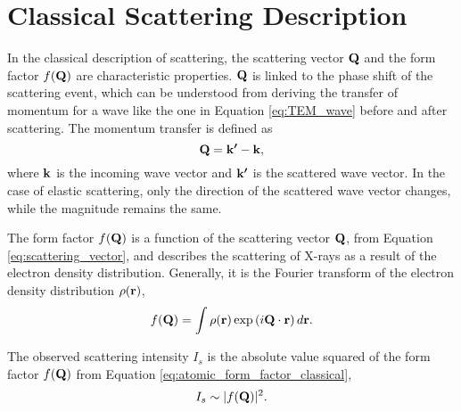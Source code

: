 

\section{Classical Scattering Description}\label{sec:classical_scattering}

In the classical description of scattering, the scattering vector $\bm{\mathrm{Q}}$ and the form factor $f(\bm{\mathrm{Q}})$ are characteristic properties.
$\bm{\mathrm{Q}}$ is linked to the phase shift of the scattering event, which can be understood from deriving the transfer of momentum for a wave like the one in Equation \eqref{eq:TEM_wave} before and after scattering.
The momentum transfer is defined as
\begin{equation}\label{eq:scattering_vector}
    \bm{\mathrm{Q}} = \bm{\mathrm{k'}} - \bm{\mathrm{k}},
\end{equation}
where $\bm{\mathrm{k}}$ is the incoming wave vector and $\bm{\mathrm{k'}}$ is the scattered wave vector.
In the case of elastic scattering, only the direction of the scattered wave vector changes, while the magnitude remains the same.

The form factor $f(\bm{\mathrm{Q}})$ is a function of the scattering vector $\bm{\mathrm{Q}}$, from Equation \eqref{eq:scattering_vector},
and describes the scattering of X-rays as a result of the electron density distribution.
Generally, it is the Fourier transform of the electron density distribution $\rho(\bm{\mathrm{r}})$,
\begin{equation}\label{eq:atomic_form_factor_classical}
    f(\bm{\mathrm{Q}}) = \int \rho(\bm{\mathrm{r}}) \exp\left(i\bm{\mathrm{Q}}\cdot\bm{\mathrm{r}}\right) d\bm{\mathrm{r}}.
\end{equation}

The observed scattering intensity $I_{s}$ is the absolute value squared of the form factor $f(\bm{\mathrm{Q}})$ from Equation \eqref{eq:atomic_form_factor_classical},
\begin{equation}\label{eq:scattering_intensity_classical}
    I_{s} \sim |f(\bm{\mathrm{Q}})|^{2}.
\end{equation}

